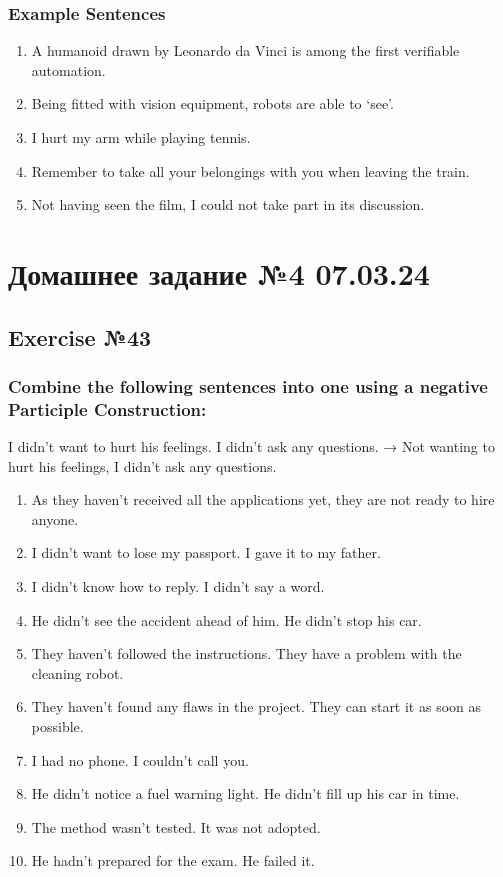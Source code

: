 \subsection*{Example Sentences}
\begin{enumerate}
      \item A humanoid drawn by Leonardo da Vinci is among the first verifiable
            automation.
      \item Being fitted with vision equipment, robots are able to ‘see’.
      \item I hurt my arm while playing tennis.
      \item Remember to take all your belongings with you when leaving the train.
      \item Not having seen the film, I could not take part in its discussion.
\end{enumerate}

\chapter{Домашнее задание №4 07.03.24}

\section{Exercise №43}
\subsection*{Combine the following sentences into one using a negative Participle Construction:}

 I didn’t want to hurt his feelings. I didn’t ask any questions. → Not wanting to hurt his
feelings, I didn’t ask any questions.

\begin{enumerate}
      \item As they haven't received all the applications yet, they are not ready to hire anyone.
      \item I didn't want to lose my passport. I gave it to my father.
      \item I didn't know how to reply. I didn't say a word.
      \item He didn't see the accident ahead of him. He didn't stop his car.
      \item They haven't followed the instructions. They have a problem with the cleaning robot.
      \item They haven't found any flaws in the project. They can start it as soon as possible.
      \item I had no phone. I couldn't call you.
      \item He didn't notice a fuel warning light. He didn't fill up his car in time.
      \item The method wasn't tested. It was not adopted.
      \item He hadn't prepared for the exam. He failed it.
\end{enumerate}

